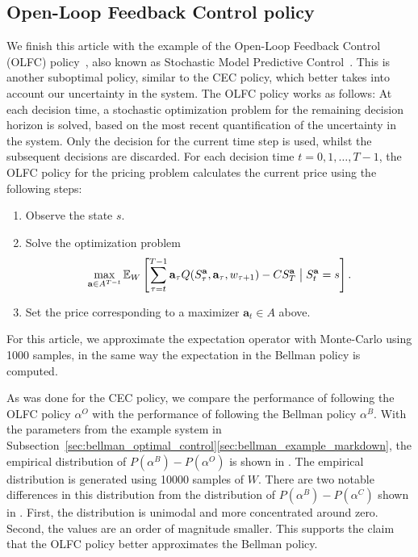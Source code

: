 \documentclass{rsproca_new}
\theoremstyle{definition}
\begin{document}
\subsection{Open-Loop Feedback Control policy}
We finish this article with the example of the Open-Loop
Feedback Control (OLFC) policy~\cite[Ch.~6]{bertsekas2005dynamic},
also known as Stochastic Model
Predictive Control~\cite{farmer2017uncertainty}. This is another suboptimal policy,
similar to the CEC policy, which better takes into account our uncertainty in the system.
The OLFC policy works as follows: At each decision time, a stochastic
optimization problem for the remaining decision horizon is
solved, based on the most recent quantification of the uncertainty in the
system. Only the decision for the current time step is used, whilst
the subsequent decisions are discarded.
For each decision time $t=0,1,\dots,T-1$, the OLFC policy for the
pricing problem calculates the current price using the following steps:
\begin{enumerate}
\item Observe the state $s$.
\item Solve the optimization problem
  \begin{equation}\label{eq:olfc_optimization_problem}
    \max_{\mathbf a\in A^{T-t}}\mathbb E_W\left[
      \sum_{\tau=t}^{T-1}\mathbf a_\tau Q(S_\tau^{\mathbf a},\mathbf
      a_\tau,w_{\tau+1})-CS_T^{\mathbf a} \bigm\vert S_t^{\mathbf a}=s \right].
  \end{equation}
\item Set the price corresponding to a maximizer
  $\mathbf a_t\in A$ above.
\end{enumerate}
For this article, we approximate the expectation operator with
Monte-Carlo using \num{1000} samples, in the same way the expectation
in the Bellman policy is computed.

As was done for the CEC policy, we compare the performance of following the
OLFC policy $\alpha^O$ with the performance of following the Bellman
policy $\alpha^B$. With the parameters from the example system in
Subsection~\ref{sec:bellman_optimal_control}\ref{sec:bellman_example_markdown},
the empirical distribution of $P(\alpha^B)-P(\alpha^O)$ is shown in
. The empirical distribution is generated
using \num{10000} samples of $W$.
There are two notable differences in this distribution from the
distribution of $P(\alpha^B)-P(\alpha^C)$ shown in .
First, the distribution is unimodal and more concentrated around zero. Second,
the values are an order of magnitude smaller.
This supports the claim that the OLFC policy better approximates the
Bellman policy.
\end{document}
